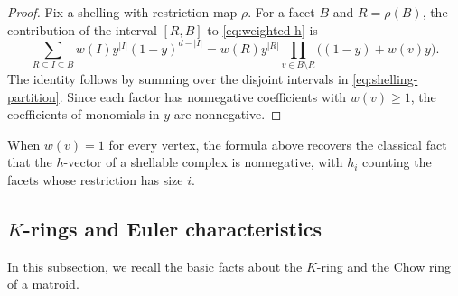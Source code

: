 \documentclass[11pt,a4paper,reqno]{amsart}
\theoremstyle{results}
\theoremstyle{definitions}
\begin{document}
\begin{proof}
  Fix a shelling with restriction map $\rho$. For a facet $B$ and
  $R=\rho(B)$, the contribution of the interval $[R,B]$ to
  \eqref{eq:weighted-h} is
  \[
    \sum_{R\subseteq I\subseteq B}w(I)y^{|I|}(1-y)^{d-|I|}
    =w(R)y^{|R|}\prod_{v\in B\setminus R}\big((1-y)+w(v)y\big).
  \]
  The identity follows by summing over the disjoint intervals in \eqref{eq:shelling-partition}.
  Since each factor has nonnegative coefficients with $w(v) \geqslant 1$, the coefficients of monomials in $y$ are nonnegative.
\end{proof}
When $w(v)=1$ for every vertex, the formula above recovers the classical fact that the $h$-vector of a
shellable complex is nonnegative, with $h_i$ counting the facets whose
restriction has size $i$.

\subsection{$K$-rings and Euler characteristics}
\label{sec:prelim-K}
In this subsection, we recall the basic facts about the $K$-ring and the Chow ring of a matroid.
\end{document}
